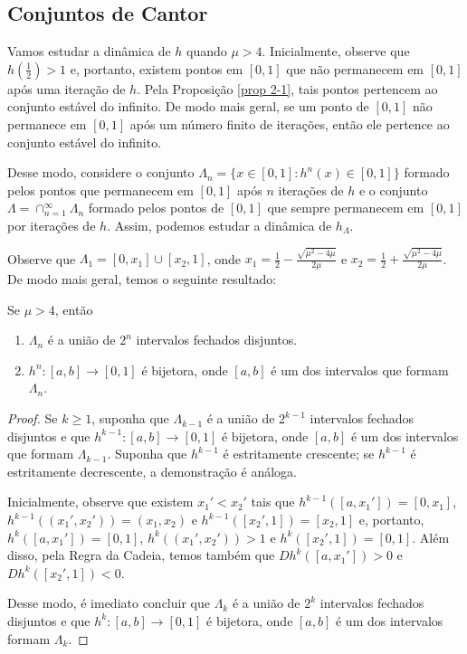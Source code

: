 \subsection{Conjuntos de Cantor}

Vamos estudar a dinâmica de $h$ quando $\mu > 4$.
Inicialmente, observe que $h(\frac{1}{2}) > 1$ e, portanto, existem pontos em $[0, 1]$ que não permanecem em $[0, 1]$ após uma iteração de $h$.
Pela Proposição \ref{prop 2-1}, tais pontos pertencem ao conjunto estável do infinito.
De modo mais geral, se um ponto de $[0, 1]$ não permanece em $[0, 1]$ após um número finito de iterações, então ele pertence ao conjunto estável do infinito.

Desse modo, considere o conjunto $\Lambda_n = \lbrace x \in [0, 1] : h^n(x) \in [0, 1] \rbrace$ formado pelos pontos que permanecem em $[0, 1]$ após $n$ iterações de $h$ e o conjunto $\Lambda =  \cap_{n = 1}^\infty \Lambda_n$ formado pelos pontos de $[0, 1]$ que sempre permanecem em $[0, 1]$ por iterações de $h$. Assim, podemos estudar a dinâmica de $h_\Lambda$.

Observe que $\Lambda_1 = [0, x_1] \cup [x_2, 1]$, onde $x_1 = \frac{1}{2} - \frac{\sqrt{\mu^2 - 4\mu}}{2\mu}$ e $x_2 = \frac{1}{2} + \frac{\sqrt{\mu^2 - 4\mu}}{2\mu}$. De modo mais geral, temos o seguinte resultado:

\begin{proposition}
Se $\mu > 4$, então
\begin{enumerate}
\item $\Lambda_n$ é a união de $2^n$ intervalos fechados disjuntos.
\item $h^n: [a, b] \to [0, 1]$ é bijetora, onde $[a, b]$ é um dos intervalos que formam $\Lambda_n$.
\end{enumerate}
\end{proposition}

\begin{proof}
Se $k \geq 1$, suponha que $\Lambda_{k-1}$ é a união de $2^{k-1}$ intervalos fechados disjuntos e que $h^{k-1}: [a, b] \to [0, 1]$ é bijetora, onde $[a, b]$ é um dos intervalos que formam $\Lambda_{k-1}$.
Suponha que $h^{k-1}$ é estritamente crescente; se $h^{k-1}$ é estritamente decrescente, a demonstração é análoga.

Inicialmente, observe que existem $x_1' < x_2'$ tais que $h^{k-1}([a, x_1']) = [0, x_1]$, $h^{k-1}((x_1', x_2')) = (x_1, x_2)$ e $h^{k-1}([x_2', 1]) = [x_2, 1]$ e, portanto, $h^k([a, x_1']) = [0, 1]$, $h^k((x_1', x_2')) > 1$  e $h^k([x_2', 1]) = [0, 1]$.
Além disso, pela Regra da Cadeia, temos também que $D h^k([a, x_1']) > 0$ e $D h^k([x_2', 1]) < 0$.

Desse modo, é imediato concluir que $\Lambda_k$ é a união de $2^k$ intervalos fechados disjuntos e que $h^k: [a, b] \to [0, 1]$ é bijetora, onde $[a, b]$ é um dos intervalos formam $\Lambda_k$.
\end{proof}

